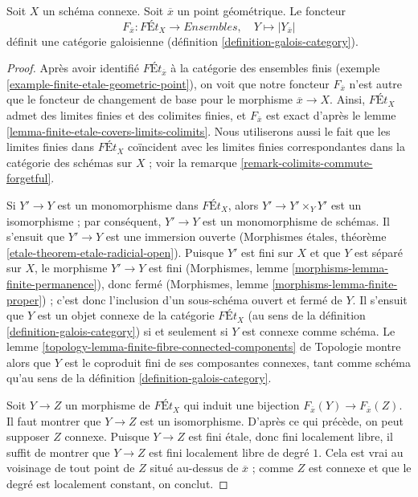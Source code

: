\begin{lemma}
\label{lemma-finite-etale-connected-galois-category}
Soit $X$ un schéma connexe. Soit $\overline{x}$ un point géométrique.
Le foncteur
$$
F_{\overline{x}} : \textit{F\'Et}_X \longrightarrow \textit{Ensembles},\quad
Y \longmapsto |Y_{\overline{x}}|
$$
définit une catégorie galoisienne (définition \ref{definition-galois-category}).
\end{lemma}

\begin{proof}
Après avoir identifié $\textit{F\'Et}_{\overline{x}}$ à la catégorie des
ensembles finis (exemple \ref{example-finite-etale-geometric-point}),
on voit que notre foncteur $F_{\overline{x}}$ n'est autre que
le foncteur de changement de base pour le morphisme $\overline{x} \to X$.
Ainsi, $\textit{F\'Et}_X$ admet des limites finies et des colimites finies,
et $F_{\overline{x}}$ est exact d'après le
lemme \ref{lemma-finite-etale-covers-limits-colimits}.
Nous utiliserons aussi le fait que les limites finies dans $\textit{F\'Et}_X$
coïncident avec les limites finies correspondantes dans la catégorie
des schémas sur $X$ ; voir la remarque \ref{remark-colimits-commute-forgetful}.

\medskip\noindent
Si $Y' \to Y$ est un monomorphisme dans $\textit{F\'Et}_X$,
alors $Y' \to Y' \times_Y Y'$ est un isomorphisme ; par
conséquent, $Y' \to Y$ est un monomorphisme de schémas. Il s'ensuit que
$Y' \to Y$ est une immersion ouverte
(Morphismes étales, théorème \ref{etale-theorem-etale-radicial-open}). Puisque
$Y'$ est fini sur $X$ et que $Y$ est séparé sur $X$,
le morphisme $Y' \to Y$ est fini
(Morphismes, lemme \ref{morphisms-lemma-finite-permanence}), donc fermé
(Morphismes, lemme \ref{morphisms-lemma-finite-proper}) ;
c'est donc l'inclusion d'un sous-schéma ouvert et fermé de $Y$.
Il s'ensuit que $Y$ est un objet connexe de la catégorie
$\textit{F\'Et}_X$ (au sens de la définition \ref{definition-galois-category})
si et seulement si $Y$ est connexe comme schéma. Le
lemme \ref{topology-lemma-finite-fibre-connected-components} de Topologie
montre alors que $Y$ est le coproduit fini de ses composantes connexes,
tant comme schéma qu'au sens de la
définition \ref{definition-galois-category}.

\medskip\noindent
Soit $Y \to Z$ un morphisme de $\textit{F\'Et}_X$ qui induit une
bijection $F_{\overline{x}}(Y) \to F_{\overline{x}}(Z)$. Il faut
montrer que $Y \to Z$ est un isomorphisme. D'après ce qui précède, on peut
supposer $Z$ connexe. Puisque $Y \to Z$ est fini étale, donc fini
localement libre, il suffit de montrer que $Y \to Z$ est fini localement
libre de degré $1$. Cela est vrai au voisinage de tout point de
$Z$ situé au-dessus de $\overline{x}$ ; comme $Z$ est connexe et que
le degré est localement constant, on conclut.
\end{proof}



